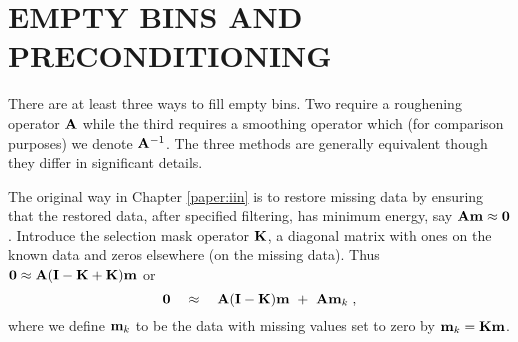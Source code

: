 %
%



\section{EMPTY BINS AND PRECONDITIONING}
There are at least three ways to fill empty bins.
Two require a roughening operator $\bold A$ while
the third requires a smoothing operator which
(for comparison purposes) we denote $\bold A^{-1}$.
The three methods are generally equivalent
though they differ in significant details.

\par
The original way in
Chapter \ref{paper:iin} is to
restore missing data
by ensuring that the restored data,
after specified filtering,
has minimum energy, say
$\bold A\bold m\approx \bold 0$.
Introduce the selection mask operator $\bold K$, 
a diagonal matrix with
ones on the known data and zeros elsewhere
(on the missing data).
Thus
$ \bold 0 \approx \bold A(\bold I-\bold K+\bold K)\bold m $ or
\begin{equation}
\bold 0 \quad\approx\quad
\bold A (\bold I-\bold K) \bold m
\ +\ 
\bold A \bold m_k\;,
\label{eqn:style0}
\end{equation}
where we define $\bold m_k$ to be the data
with missing values set to zero by 
$\bold m_k=\bold K\bold m$.

